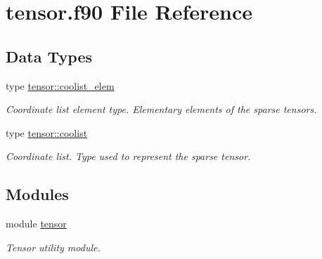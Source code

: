 \hypertarget{tensor_8f90}{}\section{tensor.\+f90 File Reference}
\label{tensor_8f90}
\subsection*{Data Types}
\begin{DoxyCompactItemize}
\item 
type \hyperlink{structtensor_1_1coolist__elem}{tensor\+::coolist\+\_\+elem}
\begin{DoxyCompactList}\small\item\em Coordinate list element type. Elementary elements of the sparse tensors. \end{DoxyCompactList}\item 
type \hyperlink{structtensor_1_1coolist}{tensor\+::coolist}
\begin{DoxyCompactList}\small\item\em Coordinate list. Type used to represent the sparse tensor. \end{DoxyCompactList}\end{DoxyCompactItemize}
\subsection*{Modules}
\begin{DoxyCompactItemize}
\item 
module \hyperlink{namespacetensor}{tensor}
\begin{DoxyCompactList}\small\item\em Tensor utility module. \end{DoxyCompactList}\end{DoxyCompactItemize}
